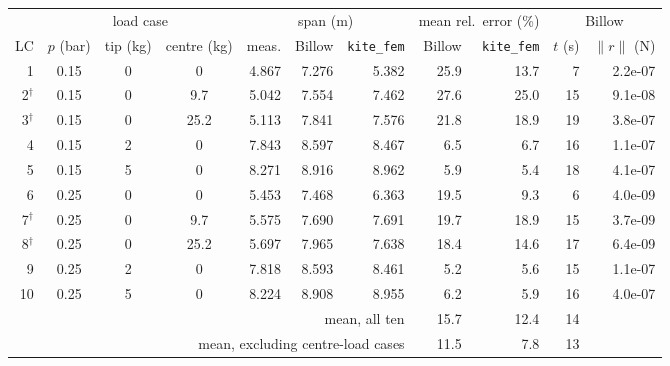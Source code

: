\begin{tabular}{rccc rrr rr rr}
\toprule
 & \multicolumn{3}{c}{load case} & \multicolumn{3}{c}{span (m)} & \multicolumn{2}{c}{mean rel.\ error (\%)} & \multicolumn{2}{c}{Billow} \\
\cmidrule(lr){2-4}\cmidrule(lr){5-7}\cmidrule(lr){8-9}\cmidrule(lr){10-11}
LC & $p$ (bar) & tip (kg) & centre (kg) & meas. & Billow & \texttt{kite\_fem} & Billow & \texttt{kite\_fem} & $t$ (s) & $\|r\|$ (N) \\
\midrule
1 & 0.15 & 0 & 0 & 4.867 & 7.276 & 5.382 & 25.9 & 13.7 & 7 & 2.2e-07 \\
2$^{\dagger}$ & 0.15 & 0 & 9.7 & 5.042 & 7.554 & 7.462 & 27.6 & 25.0 & 15 & 9.1e-08 \\
3$^{\dagger}$ & 0.15 & 0 & 25.2 & 5.113 & 7.841 & 7.576 & 21.8 & 18.9 & 19 & 3.8e-07 \\
4 & 0.15 & 2 & 0 & 7.843 & 8.597 & 8.467 & 6.5 & 6.7 & 16 & 1.1e-07 \\
5 & 0.15 & 5 & 0 & 8.271 & 8.916 & 8.962 & 5.9 & 5.4 & 18 & 4.1e-07 \\
6 & 0.25 & 0 & 0 & 5.453 & 7.468 & 6.363 & 19.5 & 9.3 & 6 & 4.0e-09 \\
7$^{\dagger}$ & 0.25 & 0 & 9.7 & 5.575 & 7.690 & 7.691 & 19.7 & 18.9 & 15 & 3.7e-09 \\
8$^{\dagger}$ & 0.25 & 0 & 25.2 & 5.697 & 7.965 & 7.638 & 18.4 & 14.6 & 17 & 6.4e-09 \\
9 & 0.25 & 2 & 0 & 7.818 & 8.593 & 8.461 & 5.2 & 5.6 & 15 & 1.1e-07 \\
10 & 0.25 & 5 & 0 & 8.224 & 8.908 & 8.955 & 6.2 & 5.9 & 16 & 4.0e-07 \\
\midrule
\multicolumn{7}{r}{mean, all ten} & 15.7 & 12.4 & 14 & \\
\multicolumn{7}{r}{mean, excluding centre-load cases} & 11.5 & 7.8 & 13 & \\
\bottomrule
\end{tabular}
